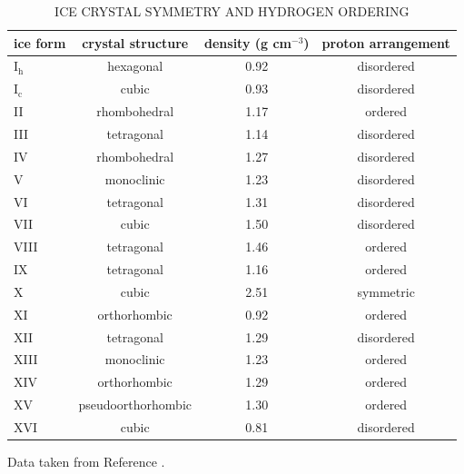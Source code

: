 \begin{table}
\centering
\caption{ICE CRYSTAL SYMMETRY AND HYDROGEN ORDERING}
\label{tab:iceProps}
\begin{tabular}{lccc}  
\hline\hline 
  ice form & crystal structure & density (g cm$^{-3}$) & proton arrangement  \\ \hline
  I$_\mathrm{h}$ & hexagonal & 0.92 & disordered \\
  I$_\mathrm{c}$ & cubic & 0.93 & disordered \\
  II & rhombohedral & 1.17 & ordered \\
  III & tetragonal & 1.14 & disordered \\
  IV & rhombohedral & 1.27 & disordered \\
  V & monoclinic & 1.23 & disordered \\
  VI & tetragonal & 1.31 & disordered \\
  VII & cubic & 1.50 & disordered \\
  VIII & tetragonal & 1.46 & ordered \\
  IX & tetragonal & 1.16 & ordered \\
  X & cubic & 2.51 & symmetric \\
  XI & orthorhombic & 0.92 & ordered \\
  XII & tetragonal & 1.29 & disordered \\
  XIII & monoclinic & 1.23 & ordered \\
  XIV & orthorhombic & 1.29 & ordered \\
  XV & pseudoorthorhombic & 1.30 & ordered \\
  XVI & cubic & 0.81 & disordered \\ 
\hline \hline
\end{tabular}
\begin{flushleft}
Data taken from Reference \cite{Chaplin2018}.
\end{flushleft}
\end{table}


